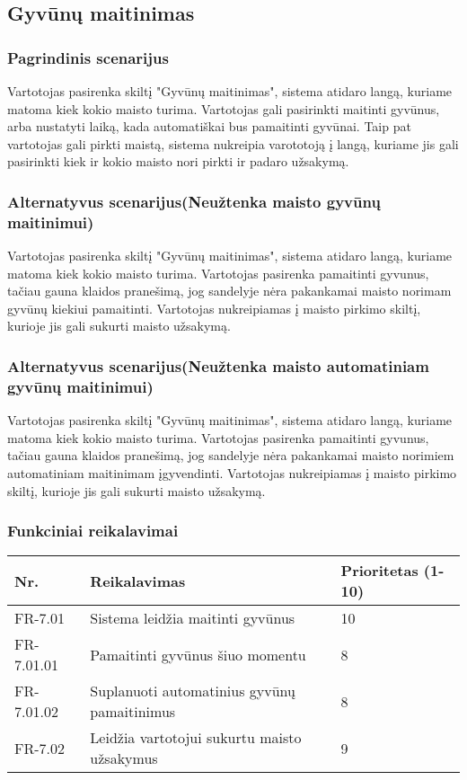 \documentclass[oneside]{VUMIFPSkursinis}
\begin{document}
\subsection{Gyvūnų maitinimas}
\subsubsection{Pagrindinis scenarijus}
	Vartotojas pasirenka skiltį "Gyvūnų maitinimas", sistema atidaro langą, kuriame matoma kiek kokio maisto turima. Vartotojas gali pasirinkti maitinti gyvūnus, arba nustatyti laiką, kada automatiškai bus pamaitinti gyvūnai. Taip pat vartotojas gali pirkti maistą, sistema nukreipia varototoją į langą, kuriame jis gali pasirinkti kiek ir kokio maisto nori pirkti ir padaro užsakymą.
\subsubsection{Alternatyvus scenarijus(Neužtenka maisto gyvūnų maitinimui)}
	Vartotojas pasirenka skiltį "Gyvūnų maitinimas", sistema atidaro langą, kuriame matoma kiek kokio maisto turima. Vartotojas pasirenka pamaitinti gyvunus, tačiau gauna klaidos pranešimą, jog sandelyje nėra pakankamai maisto norimam gyvūnų kiekiui pamaitinti. Vartotojas nukreipiamas į maisto pirkimo skiltį, kurioje jis gali sukurti maisto užsakymą.
\subsubsection{Alternatyvus scenarijus(Neužtenka maisto automatiniam gyvūnų maitinimui)}
	Vartotojas pasirenka skiltį "Gyvūnų maitinimas", sistema atidaro langą, kuriame matoma kiek kokio maisto turima. Vartotojas pasirenka pamaitinti gyvunus, tačiau gauna klaidos pranešimą, jog sandelyje nėra pakankamai maisto norimiem automatiniam maitinimam įgyvendinti. Vartotojas nukreipiamas į maisto pirkimo skiltį, kurioje jis gali sukurti maisto užsakymą.
\subsubsection{Funkciniai reikalavimai}
\begin{table}[htbp]
	\begin{tabularx}{1\textwidth}{ |P{2.5cm}|X|P{3cm }| }  \hline
           	Nr. & Reikalavimas &  Prioritetas (1-10)  \\   \hline 
         		FR-7.01 & Sistema leidžia maitinti gyvūnus & 10  \\   \hline
		FR-7.01.01 & Pamaitinti gyvūnus šiuo momentu & 8  \\ \hline
		FR-7.01.02 & Suplanuoti automatinius gyvūnų pamaitinimus & 8 \\ \hline
			FR-7.02 & Leidžia vartotojui sukurtu maisto užsakymus & 9 \\  \hline
	\end{tabularx}
\end{table}
\end{document}
